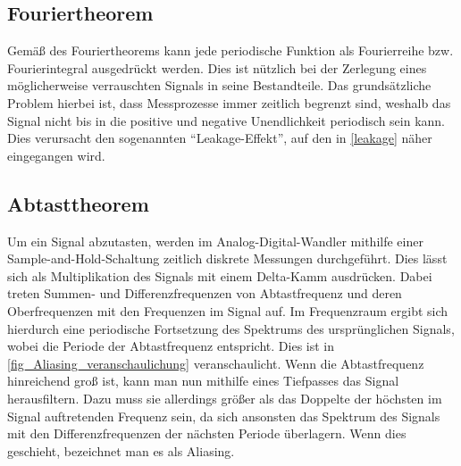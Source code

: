 \documentclass[
a4paper,
12pt,
pagesize,
ngerman
]{scrartcl}
\begin{document}
	\subsection{Fouriertheorem} %
	Gemäß des Fouriertheorems kann jede periodische Funktion als Fourierreihe bzw. Fourierintegral ausgedrückt werden.
	Dies ist nützlich bei der Zerlegung eines möglicherweise verrauschten Signals in seine Bestandteile.
	Das grundsätzliche Problem hierbei ist, dass Messprozesse immer zeitlich begrenzt sind, weshalb das Signal nicht bis in die positive und negative Unendlichkeit periodisch sein kann.
	Dies verursacht den sogenannten \enquote{Leakage-Effekt}, auf den in \cref{leakage} näher eingegangen wird.
	
	\subsection{Abtasttheorem}
	Um ein Signal abzutasten, werden im Analog-Digital-Wandler mithilfe einer Sample-and-Hold-Schaltung zeitlich diskrete Messungen durchgeführt.
	Dies lässt sich als Multiplikation des Signals mit einem Delta-Kamm ausdrücken.
	Dabei treten Summen- und Differenzfrequenzen von Abtastfrequenz und deren Oberfrequenzen mit den Frequenzen im Signal auf.
	Im Frequenzraum ergibt sich hierdurch eine periodische Fortsetzung des Spektrums des ursprünglichen Signals, wobei die Periode der Abtastfrequenz entspricht.
	Dies ist in \cref{fig_Aliasing_veranschaulichung} veranschaulicht.
	Wenn die Abtastfrequenz hinreichend groß ist, kann man nun mithilfe eines Tiefpasses das Signal herausfiltern.
	Dazu muss sie allerdings größer als das Doppelte der höchsten im Signal auftretenden Frequenz sein, da sich ansonsten das Spektrum des Signals mit den Differenzfrequenzen der nächsten Periode überlagern.
	Wenn dies geschieht, bezeichnet man es als Aliasing.
	
\end{document}
